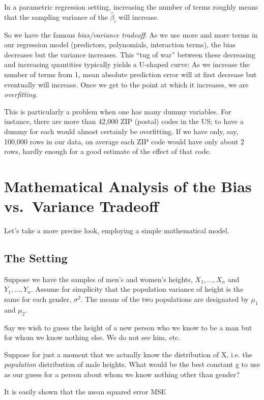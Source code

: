 In a parametric regression setting, increasing the number of terms
roughly means that the sampling variance of the $\widehat{\beta}_i$ will
increase.

So we have the famous \textit{bias/variance tradeoff}:  As we use more and
more terms in our regression model (predictors, polynomials, interaction
terms), the bias decreases but the variance increases.  This ``tug of
war'' between these decreasing and increasing quantities typically
yields a U-shaped curve:  As we increase the number of terms from 1,
mean absolute prediction error will at first decrease but eventually
will increase.  Once we get to the point at which it increases, we are
\textit{overfitting}.

This is particularly a problem when one has many dummy variables. For
instance, there are more than 42,000 ZIP (postal) codes in the US; to
have a dummy for each would almost certainly be overfitting.  If we have
only, say, 100,000 rows in our data, on average each ZIP code would have
only about 2 rows, hardly enough for a good estimate of the effect of
that code.

\section{Mathematical Analysis of the Bias vs.\ Variance Tradeoff}

Let's take a more precise  look, employing a simple mathematical model.

\subsection{The Setting}

Suppose we have the samples of men's and women's heights, $X_1,...,X_n$
and $Y_1,...,Y_n$.  Assume for simplicity that the population variance
of height is the same for each gender, $\sigma^2$.  The means of the two
populations are designated by $\mu_1$ and $\mu_2$.

Say we wish to guess the height of a new person who we know to be a man
but for whom we know nothing else.  We do not see him, etc.

Suppose for just a moment that we actually know the distribution of X,
i.e. the {\it population} distribution of male heights.  What would be
the best constant g to use as our guess for a person about whom we know
nothing other than gender?

It is easily shown that the mean squared error MSE 

